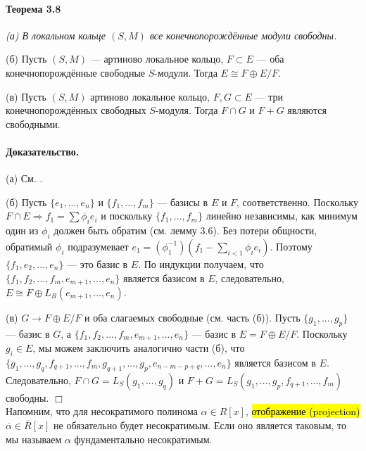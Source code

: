 \documentclass[a4paper,12pt]{article}
\begin{document}
\paragraph{Теорема 3.8}
{\itshape
(а) В локальном кольце $(S, M)$ все конечнопорождённые модули свободны.

(б) Пусть $(S, M)$ --- артиново локальное кольцо, $F \subset E$ --- оба конечнопорождённые свободные $S$-модули. Тогда $E \cong F \oplus E/F$.

(в) Пусть $(S, M)$ артиново локальное кольцо, $F, G \subset E$ --- три конечнопорождённых свободных $S$-модуля. Тогда $F \cap G$ и $F + G$ являются свободными. 
}

\paragraph{Доказательство.}
(а) См. \cite{bib10}.

(б) Пусть $\{e_1, ..., e_n\}$ и $\{f_1, ..., f_m\}$ --- базисы в $E$ и $F$, соответственно. Поскольку $F \cap E \Rightarrow f_1 = \sum \phi_i e_i$ и поскольку $\{f_1, ..., f_m\}$ линейно независимы, как минимум один из $\phi_i$ должен быть обратим (см. лемму 3.6). Без потери общности, обратимый $\phi_i$ подразумевает $e_1 = (\phi_1^{-1})(f_1 - \sum_{i < 1} \phi_i e_i)$. Поэтому $\{f_1, e_2, ..., e_n\}$ --- это базис в $E$. По индукции получаем, что $\{f_1, f_2, ..., f_m, e_{m+1}, ..., e_n\}$ является базисом в $E$, следовательно, $E \cong F \oplus L_R (e_{m+1}, ..., e_n)$.

(в) $G \rightarrow F \oplus E/F$ и оба слагаемых свободные (см. часть (б)). Пусть $\{g_1,...,g_p\}$ --- базис в $G$, а $\{f_1, f_2, ..., f_m, e_{m+1}, ..., e_n\}$ --- базис в $E =  F \oplus E/F$. Поскольку $g_i \in E$, мы можем заключить аналогично части (б), что $\{g_1, ..., g_q, f_{q+1}, ..., f_m, g_{q+1}, ..., g_p, e_{n-m-p+q}, ..., e_n\}$ является базисом в $E$. Следовательно, $F \cap G = L_S(g_1, ..., g_q)$ и $F + G = L_S(g_1, ..., g_p, f_{q+1}, ..., f_m)$ свободны. $\Box$ \\

Напомним, что для несократимого полинома $\alpha \in R[x]$, \hl{отображение (projection)} $\overline{\alpha} \in \overline{R}[x]$ не обязательно будет несократимым. Если оно является таковым, то мы называем $\alpha$ фундаментально несократимым.
\end{document}
